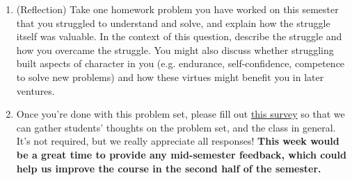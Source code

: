 \documentclass[11pt]{article}
\begin{document}
\begin{enumerate}
\item (Reflection) Take one homework problem you have worked on this semester that you struggled to understand and solve, and explain how the struggle itself was valuable. In the context of this question, describe the struggle and how you overcame the struggle. You might also discuss whether struggling built aspects of character in you (e.g. endurance, self-confidence, competence to solve new problems) and how these virtues might benefit you in later ventures.

\item Once you're done with this problem set, please fill out \href{https://forms.gle/1BbDCCvuM8gf38tA7}{this survey} so that we can gather students' thoughts on the problem set, and the class in general. It's not required, but we really appreciate all responses! \textbf{This week would be a great time to provide any mid-semester feedback, which could help us improve the course in the second half of the semester.}

\end{enumerate}
\end{document}
